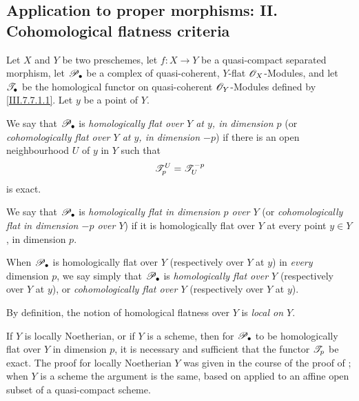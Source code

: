 \subsection{Application to proper morphisms: II. Cohomological flatness criteria}
\label{subsection:III.7.8}
\label{III.7.8}

\begin{definition}[7.8.1]
\label{III.7.8.1}
Let $X$ and $Y$ be two preschemes, let $f:X\to Y$ be a
quasi-compact separated morphism, let $\mathscr{P}_\bullet$ be a
complex of quasi-coherent, $Y$-flat $\mathscr{O}_X$-Modules, and
let $\mathscr{T}_\bullet$ be the homological functor on
quasi-coherent $\mathscr{O}_Y$-Modules defined by
\eqref{III.7.7.1.1}.  Let $y$ be a point of $Y$.

We say that $\mathscr{P}_\bullet$ is \emph{homologically flat over
$Y$ at $y$, in dimension $p$} (or \emph{cohomologically flat
over $Y$ at $y$, in dimension $-p$}) if there is an open
neighbourhood $U$ of $y$ in $Y$ such that
\[
  \mathscr{T}_p^U=\mathscr{T}^{-p}_U
\]
is exact.

We say that $\mathscr{P}_\bullet$ is \emph{homologically flat in
dimension $p$ over $Y$} (or \emph{cohomologically flat in
dimension $-p$ over $Y$}) if it is homologically flat over
$Y$ at every point $y\in Y$, in dimension $p$.

When $\mathscr{P}_\bullet$ is homologically flat over $Y$
(respectively over $Y$ at $y$) in \emph{every} dimension
$p$, we say simply that $\mathscr{P}_\bullet$ is
\emph{homologically flat over $Y$} (respectively over $Y$ at
$y$), or \emph{cohomologically flat over $Y$} (respectively
over $Y$ at $y$).
\end{definition}

\begin{env}[7.8.2]
\label{III.7.8.2}
By definition, the notion of homological flatness over $Y$
is \emph{local on $Y$}.

If $Y$ is locally Noetherian, or if $Y$ is a scheme, then
for $\mathscr{P}_\bullet$ to be homologically flat over $Y$ in
dimension $p$, it is necessary and sufficient that the
functor $\mathscr{T}_p$ be exact.  The proof for locally
Noetherian $Y$ was given in the course of the proof of
; when $Y$ is a scheme the argument is the
same, based on  applied to an affine open
subset of a quasi-compact scheme.
\end{env}

